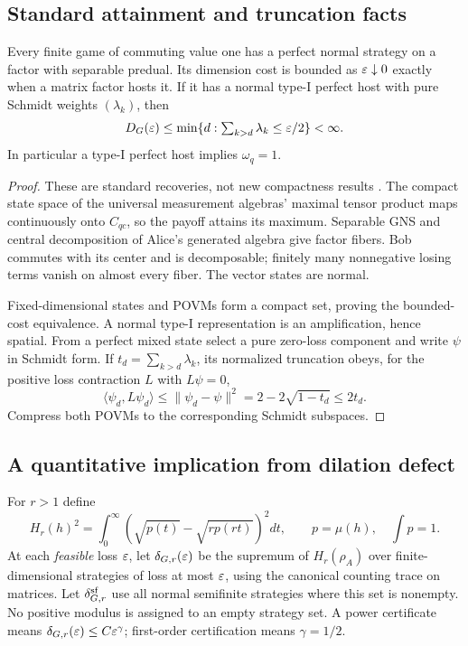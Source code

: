 \subsection{Standard attainment and truncation facts}
\begin{proposition}\label{prop:attainment}
Every finite game of commuting value one has a perfect normal strategy on a factor with separable predual. Its dimension cost is bounded as $\varepsilon\downarrow0$ exactly when a matrix factor hosts it. If it has a normal type-I perfect host with pure Schmidt weights $(\lambda_k)$, then
\[
 D_G(\varepsilon)\le\min\{d: \textstyle\sum_{k>d}\lambda_k\le\varepsilon/2\}<\infty.
\]
In particular a type-I perfect host implies $\omega_q=1$.
\end{proposition}
\begin{proof}
These are standard recoveries, not new compactness results \cite{NPA,MNY}. The compact state space of the universal measurement algebras' maximal tensor product maps continuously onto $C_{qc}$, so the payoff attains its maximum. Separable GNS and central decomposition of Alice's generated algebra give factor fibers. Bob commutes with its center and is decomposable; finitely many nonnegative losing terms vanish on almost every fiber. The vector states are normal.

Fixed-dimensional states and POVMs form a compact set, proving the bounded-cost equivalence. A normal type-I representation is an amplification, hence spatial. From a perfect mixed state select a pure zero-loss component and write $\psi$ in Schmidt form. If $t_d=\sum_{k>d}\lambda_k$, its normalized truncation obeys, for the positive loss contraction $L$ with $L\psi=0$,
\[
 \langle\psi_d,L\psi_d\rangle\le\|\psi_d-\psi\|^2
       =2-2\sqrt{1-t_d}\le2t_d.
\]
Compress both POVMs to the corresponding Schmidt subspaces.
\end{proof}

\subsection{A quantitative implication from dilation defect}
For $r>1$ define
\[
 H_r(h)^2=\int_0^\infty\left(\sqrt{p(t)}-\sqrt{rp(rt)}\right)^2dt,
 \qquad p=\mu(h),\quad\int p=1.
\]
At each \emph{feasible} loss $\varepsilon$, let $\delta_{G,r}(\varepsilon)$ be the supremum of $H_r(\rho_A)$ over finite-dimensional strategies of loss at most $\varepsilon$, using the canonical counting trace on matrices. Let $\delta^{\rm sf}_{G,r}$ use all normal semifinite strategies where this set is nonempty. No positive modulus is assigned to an empty strategy set. A power certificate means $\delta_{G,r}(\varepsilon)\le C\varepsilon^\gamma$; first-order certification means $\gamma=1/2$.

